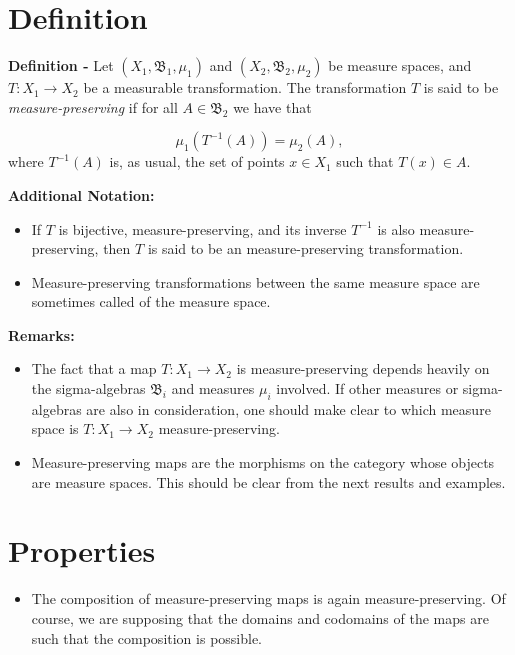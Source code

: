 \documentclass[12pt]{article}
\begin{document}
\section{Definition}

{\bf Definition -} Let $(X_1, \mathfrak{B}_1, \mu_1)$ and $(X_2, \mathfrak{B}_2, \mu_2)$ be measure spaces, and $T:X_1 \to X_2$ be a measurable transformation.  The transformation $T$ is said to be \emph{measure-preserving} if for all $A \in \mathfrak{B}_2$ we have that

\begin{equation*}
\mu_1(T^{-1}(A)) = \mu_2(A),
\end{equation*}
where $T^{-1}(A)$ is, as usual, the set of points $x\in X_1$ such that $T(x)\in A$.

{\bf Additional Notation:}
\begin{itemize}
\item If $T$ is bijective, measure-preserving, and its inverse $T^{-1}$ is also measure-preserving, then $T$ is said to be an \emph{} measure-preserving transformation.
\end{itemize}
\begin{itemize}
\item Measure-preserving transformations between the same measure space are sometimes called \emph{} of the measure space.
\end{itemize}

{\bf Remarks:}
\begin{itemize}
\item The fact that a map $T:X_1 \longrightarrow X_2$ is measure-preserving depends heavily on the sigma-algebras $\mathfrak{B}_i$ and measures $\mu_i$ involved. If other measures or sigma-algebras are also in consideration, one should make clear to which measure space is $T:X_1 \longrightarrow X_2$ measure-preserving.
\end{itemize}
\begin{itemize}
\item Measure-preserving maps are the morphisms on the category whose objects are measure spaces. This should be clear from the next results and examples.
\end{itemize}

\section{Properties}

\begin{itemize}
\item The composition of measure-preserving maps is again measure-preserving. Of course, we are supposing that the domains and codomains of the maps are such that the composition is possible.
\end{itemize}
\end{document}
